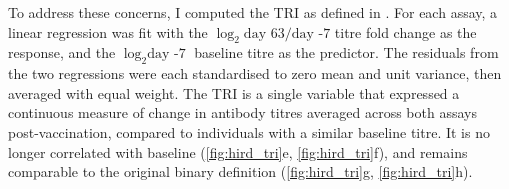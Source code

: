 %
To address these concerns, I computed the \gls{TRI} as defined in \textcite{bucasas2011EarlyPatternsGene}.
For each assay, a linear regression was fit with the $\log_2{\text{day 63}/\text{day -7}}$ titre fold change as the response, and the $\log_2{\text{day -7}}$ baseline titre as the predictor.
The residuals from the two regressions were each standardised to zero mean and unit variance, then averaged with equal weight.
The \gls{TRI} is a single variable that expressed a continuous measure of change in antibody titres averaged across both assays post-vaccination, 
compared to individuals with a similar baseline titre. 
It is no longer correlated with baseline (\cref{fig:hird_tri}e, \cref{fig:hird_tri}f),
and remains comparable to the original binary definition (\cref{fig:hird_tri}g, \cref{fig:hird_tri}h).

